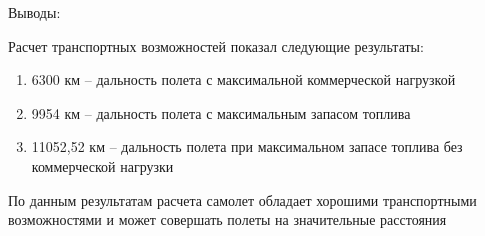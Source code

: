 \begin{center}
    Выводы:
\end{center}

Расчет транспортных возможностей показал следующие результаты:
\begin{enumerate}
    \item 6300 км -- дальность полета с максимальной коммерческой нагрузкой
    \item 9954 км -- дальность полета с максимальным запасом топлива
    \item 11052,52 км -- дальность полета при максимальном запасе топлива без
коммерческой нагрузки
\end{enumerate}

По данным результатам расчета самолет обладает хорошими транспортными
возможностями и может совершать полеты на значительные расстояния 


